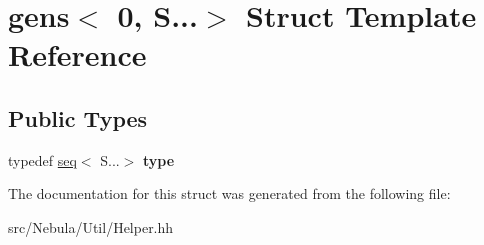 \hypertarget{structgens_3_010_00_01S_8_8_8_4}{\section{gens$<$ 0, S...$>$ Struct Template Reference}
\label{structgens_3_010_00_01S_8_8_8_4}
}
\subsection*{Public Types}
\begin{DoxyCompactItemize}
\item 
\hypertarget{structgens_3_010_00_01S_8_8_8_4_a3c50f0313d7187280e401848eef1bb29}{typedef \hyperlink{structseq}{seq}$<$ S...$>$ {\bfseries type}}\label{structgens_3_010_00_01S_8_8_8_4_a3c50f0313d7187280e401848eef1bb29}

\end{DoxyCompactItemize}


The documentation for this struct was generated from the following file\-:\begin{DoxyCompactItemize}
\item 
src/\-Nebula/\-Util/Helper.\-hh\end{DoxyCompactItemize}
